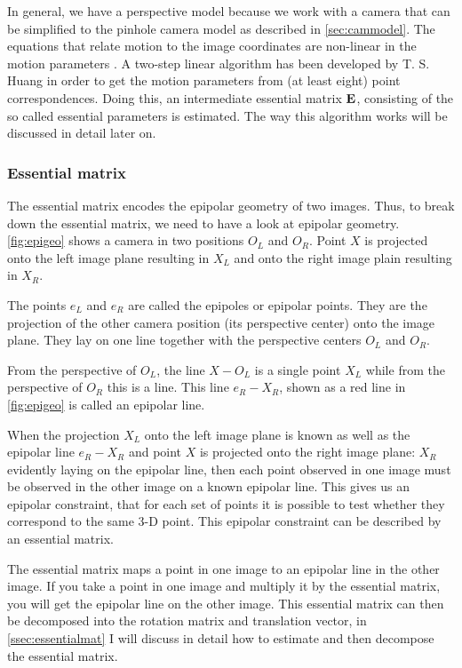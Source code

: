 In general, we have a perspective model because we work with a camera that can be simplified to the pinhole camera model as described in \autoref{sec:cammodel}. The equations that relate motion to the image coordinates are non-linear in the motion parameters \cite{tekalp}. A two-step linear algorithm has been developed by T. S. Huang \cite{improc} in order to get the motion parameters from (at least eight) point correspondences. Doing this, an intermediate essential matrix $\mathbf{E}$, consisting of the so called essential parameters is estimated. The way this algorithm works will be discussed in detail later on.

\subsubsection{Essential matrix}
The essential matrix encodes the epipolar geometry of two images. Thus, to break down the essential matrix, we need to have a look at epipolar geometry. \autoref{fig:epigeo} shows a camera in two positions $O_L$ and $O_R$. Point $X$ is projected onto the left image plane resulting in $X_L$ and onto the right image plain resulting in $X_R$.\bigskip

The points $e_L$ and $e_R$ are called the epipoles or epipolar points. They are the projection of the other camera position (its perspective center) onto the image plane. They lay on one line together with the perspective centers $O_L$ and $O_R$.\bigskip

From the perspective of $O_L$, the line $X-O_L$ is a single point $X_L$ while from the perspective of $O_R$ this is a line. This line $e_R-X_R$, shown as a red line in \autoref{fig:epigeo} is called an epipolar line.\bigskip

When the projection $X_L$ onto the left image plane is known as well as the epipolar line $e_R-X_R$ and point $X$ is projected onto the right image plane: $X_R$ evidently laying on the epipolar line, then each point observed in one image must be observed in the other image on a known epipolar line. This gives us an epipolar constraint, that for each set of points it is possible to test whether they correspond to the same 3-D point. This epipolar constraint can be described by an essential matrix.\bigskip

The essential matrix maps a point in one image to an epipolar line in the other image. If you take a point in one image and multiply it by the essential matrix, you will get the epipolar line on the other image. This essential matrix can then be decomposed into the rotation matrix and translation vector, in \autoref{ssec:essentialmat} I will discuss in detail how to estimate and then decompose the essential matrix.\bigskip

